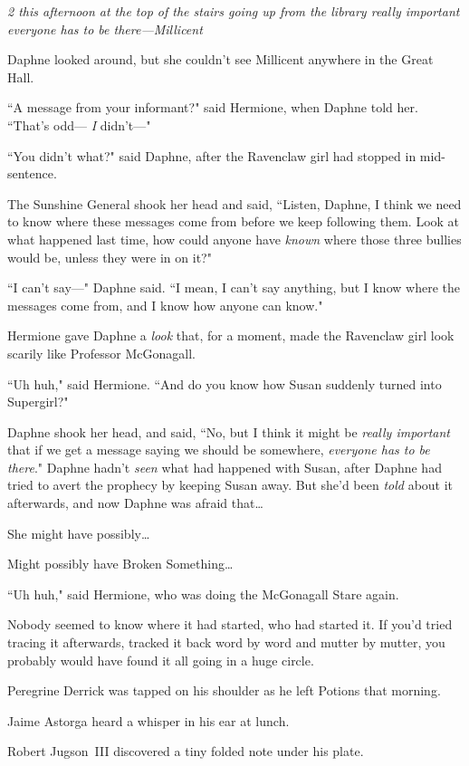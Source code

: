 \emph{2 this afternoon at the top of the stairs going up from the library \emph{really important} everyone has to be there—Millicent}

Daphne looked around, but she couldn't see Millicent anywhere in the Great Hall.

``A message from your informant?" said Hermione, when Daphne told her. ``That's odd— \emph{I} didn't—"

``You didn't what?" said Daphne, after the Ravenclaw girl had stopped in mid-sentence.

The Sunshine General shook her head and said, ``Listen, Daphne, I think we need to know where these messages come from before we keep following them. Look at what happened last time, how could anyone have \emph{known} where those three bullies would be, unless they were in on it?"

``I can't say—" Daphne said. ``I mean, I can't say anything, but I know where the messages come from, and I know how anyone can know."

Hermione gave Daphne a \emph{look} that, for a moment, made the Ravenclaw girl look scarily like Professor McGonagall.

``Uh huh," said Hermione. ``And do you know how Susan suddenly turned into Supergirl?"

Daphne shook her head, and said, ``No, but I think it might be \emph{really important} that if we get a message saying we should be somewhere, \emph{everyone has to be there}." Daphne hadn't \emph{seen} what had happened with Susan, after Daphne had tried to avert the prophecy by keeping Susan away. But she'd been \emph{told} about it afterwards, and now Daphne was afraid that{\ldots}

She might have possibly{\ldots}

Might possibly have Broken Something{\ldots}

``Uh huh," said Hermione, who was doing the McGonagall Stare again.

\later

Nobody seemed to know where it had started, who had started it. If you'd tried tracing it afterwards, tracked it back word by word and mutter by mutter, you probably would have found it all going in a huge circle.

Peregrine Derrick was tapped on his shoulder as he left Potions that morning.

Jaime Astorga heard a whisper in his ear at lunch.

Robert Jugson~III discovered a tiny folded note under his plate.


